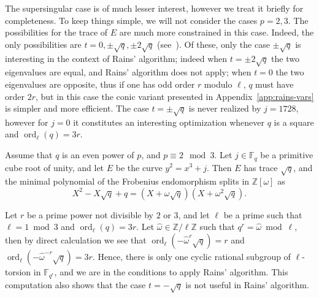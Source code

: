 \documentclass[12pt]{article}
\theoremstyle{plain}
\theoremstyle{definition}
\DeclareMathOperator{\order}{ord} %
\def\Z{\ensuremath{\mathbb{Z}}}
\def\F{\ensuremath{\mathbb{F}}}
\newcounter{algorithm}
\begin{document}
The supersingular case is of much lesser interest, however we treat it
briefly for completeness. %
To keep things simple, we will not consider the cases $p=2,3$. %
The possibilities for the trace of $E$ are much more constrained in
this case. %
Indeed, the only possibilities are $t=0,\pm\sqrt{q},\pm2\sqrt{q}$
(see~\cite{waterhouse69}). %
Of these, only the case $\pm\sqrt{q}$ is interesting in the context of
Rains' algorithm; indeed when $t=\pm2\sqrt{q}$ the two eigenvalues are
equal, and Rains' algorithm does not apply; when $t=0$ the two
eigenvalues are opposite, thus if one has odd order $r$ modulo $\ell$,
$q$ must have order $2r$, but in this case the conic variant presented
in Appendix~\ref{app:rains-vars} is simpler and more efficient. %
The case $t=\pm\sqrt{q}$ is never realized by $j=1728$, however for
$j=0$ it constitutes an interesting optimization whenever $q$ is a
square and $\order_\ell(q)=3r$. %

Assume that $q$ is an even power of $p$, and $p\equiv 2\mod 3$. %
Let $j\in\F_q$ be a primitive cube root of unity, and let $E$ be the
curve $y^2=x^3+j$. %
Then $E$ has trace $\sqrt{q}$, and the minimal polynomial of the
Frobenius endomorphism splits in $\Z[\omega]$ as
\begin{equation*}
  X^2 - X\sqrt{q} + q = (X+\omega\sqrt{q})(X+\omega^2\sqrt{q}).
\end{equation*}

Let $r$ be a prime power not divisible by $2$ or $3$, and let $\ell$
be a prime such that $\ell=1\bmod 3$ and $\order_\ell(q)=3r$. %
Let $\hat\omega\in\Z/\ell\Z$ such that $q^r=\hat\omega\bmod\ell$, then
by direct calculation we see that
$\order_\ell(-\hat\omega^r\sqrt{q})=r$ and
$\order_\ell(-\hat\omega^{-r}\sqrt{q})=3r$. %
Hence, there is only one cyclic rational subgroup of $\ell$-torsion in
$\F_{q^r}$, and we are in the conditions to apply Rains' algorithm. %
This computation also shows that the case $t=-\sqrt{q}$ is not useful
in Rains' algorithm.
\end{document}
